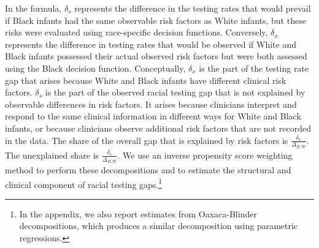 In the formula, $\delta_s$ represents the difference in the testing rates that would prevail if Black infants had the same observable risk factors as White infants, but these risks were evaluated using race-specific decision functions. Conversely, $\delta_x$ represents the difference in testing rates that would be observed if White and Black infants possessed their actual observed risk factors but were both assessed using the Black decision function. Conceptually, $\delta_x$ is the part of the testing rate gap that arises because White and Black infants have different clinical risk factors. $\delta_s$ is the part of the observed racial testing gap that is not explained by observable differences in risk factors. It arises because clinicians interpret and respond to the same clinical information in different ways for White and Black infants, or because clinicians observe additional risk factors that are not recorded in the data. The share of the overall gap that is explained by risk factors is $\frac{\delta_x}{\Delta_{B,W}}$. The unexplained share is $\frac{\delta_s}{\Delta_{B,W}}$. We use an inverse propensity score weighting method to perform these decompositions and to estimate the structural and clinical component of racial testing gaps.\footnote{In the appendix, we also report estimates from Oaxaca-Blinder decompositions, which produces a similar decomposition using parametric regressions.} 
